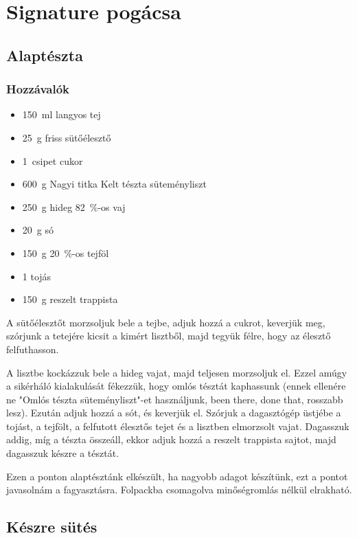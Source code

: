 \newpage
\section*{Signature pogácsa}

\subsection*{Alaptészta}
\subsubsection*{Hozzávalók}
\begin{itemize}
    \item \qty{150}{\ml} langyos tej
    \item \qty{25}{\g} friss sütőélesztő
    \item \qty{1}{csipet} cukor
    \item \qty{600}{\g} Nagyi titka Kelt tészta süteményliszt
    \item \qty{250}{\g} hideg \qty{82}{\percent}-os vaj
    \item \qty{20}{\g} só
    \item \qty{150}{g} \qty{20}{\percent}-os tejföl
    \item \num{1} tojás
    \item \qty{150}{\g} reszelt trappista
\end{itemize}

A sütőélesztőt morzsoljuk bele a tejbe, adjuk hozzá a cukrot, keverjük meg, szórjunk a tetejére kicsit a kimért lisztből, majd tegyük félre, hogy az élesztő felfuthasson.

A lisztbe kockázzuk bele a hideg vajat, majd teljesen morzsoljuk el. Ezzel amúgy a sikérháló kialakulását fékezzük, hogy omlós tésztát kaphassunk (ennek ellenére ne "Omlós tészta süteményliszt"-et használjunk, been there, done that, rosszabb lesz). Ezután adjuk hozzá a sót, és keverjük el. Szórjuk a dagasztógép üstjébe a tojást, a tejfölt, a felfutott élesztős tejet és a lisztben elmorzsolt vajat. Dagasszuk addig, míg a tészta összeáll, ekkor adjuk hozzá a reszelt trappista sajtot, majd dagasszuk készre a tésztát.

Ezen a ponton alaptésztánk elkészült, ha nagyobb adagot készítünk, ezt a pontot javasolnám a fagyasztásra. Folpackba csomagolva minőségromlás nélkül elrakható.

\subsection*{Készre sütés}
